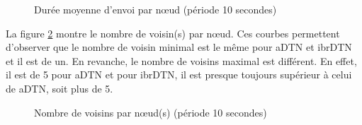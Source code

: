 \documentclass[a4paper,10pt]{article}
\begin{document}
\begin{figure}[h!]
    \centering
    \caption{Durée moyenne d'envoi par nœud (période 10 secondes)}
    \label{fig:10_avg_snd_duration}
\end{figure}

La figure \ref{fig:10_nb_neighbors} montre le nombre de voisin(s) par nœud. Ces courbes permettent d'observer que le nombre de voisin minimal est le même pour aDTN et ibrDTN et il est de un. En revanche, le nombre de voisins maximal est différent. En effet, il est de 5 pour aDTN et pour ibrDTN, il est presque toujours supérieur à celui de aDTN, soit plus de 5.\par

\begin{figure}[h!]
    \centering
    \caption{Nombre de voisins par nœud(s) (période 10 secondes)}
    \label{fig:10_nb_neighbors}
\end{figure}
\end{document}
